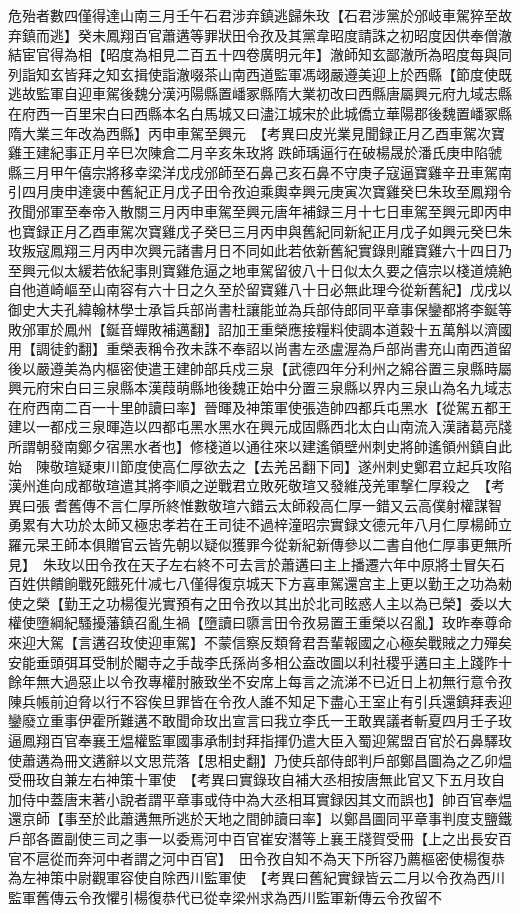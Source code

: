 危殆者數四僅得達山南三月壬午石君涉弃鎮逃歸朱玫【石君涉黨於邠岐車駕猝至故弃鎮而逃】癸未鳳翔百官蕭遘等罪狀田令孜及其黨韋昭度請誅之初昭度因供奉僧澈結宦官得為相【昭度為相見二百五十四卷廣明元年】澈師知玄鄙澈所為昭度每與同列詣知玄皆拜之知玄揖使詣澈啜茶山南西道監軍馮翊嚴遵美迎上於西縣【節度使既逃故監軍自迎車駕後魏分漢沔陽縣置嶓冢縣隋大業初改曰西縣唐屬興元府九域志縣在府西一百里宋白曰西縣本名白馬城又曰濜江城宋於此城僑立華陽郡後魏置嶓冢縣隋大業三年改為西縣】丙申車駕至興元　【考異曰皮光業見聞録正月乙酉車駕次寶雞王建紀事正月辛巳次陳倉二月辛亥朱玫將跌師瑀逼行在破楊晟於潘氏庚申陷虢縣三月甲午僖宗將移幸梁洋戊戌邠師至石鼻己亥石鼻不守庚子寇逼寶雞辛丑車駕南引四月庚申達褒中舊紀正月戊子田令孜迫乘輿幸興元庚寅次寶雞癸巳朱玫至鳳翔令孜聞邠軍至奉帝入散關三月丙申車駕至興元唐年補録三月十七日車駕至興元即丙申也寶録正月乙酉車駕次寶雞戊子癸巳三月丙申與舊紀同新紀正月戊子如興元癸巳朱玫叛寇鳳翔三月丙申次興元諸書月日不同如此若依新舊紀實錄則離寶雞六十四日乃至興元似太緩若依紀事則寶雞危逼之地車駕留彼八十日似太久要之僖宗以棧道燒絶自他道崎嶇至山南容有六十日之久至於留寶雞八十日必無此理今從新舊紀】戊戌以御史大夫孔緯翰林學士承旨兵部尚書杜讓能並為兵部侍郎同平章事保鑾都將李鋋等敗邠軍於鳳州【鋋音蟬敗補邁翻】詔加王重榮應接糧料使調本道穀十五萬斛以濟國用【調徒釣翻】重榮表稱令孜未誅不奉詔以尚書左丞盧渥為戶部尚書充山南西道留後以嚴遵美為内樞密使遣王建帥部兵戍三泉【武德四年分利州之綿谷置三泉縣時屬興元府宋白曰三泉縣本漢葭萌縣地後魏正始中分置三泉縣以界内三泉山為名九域志在府西南二百一十里帥讀曰率】晉暉及神策軍使張造帥四都兵屯黑水【從駕五都王建以一都戍三泉暉造以四都屯黑水黑水在興元成固縣西北太白山南流入漢諸葛亮牋所謂朝發南鄭夕宿黑水者也】修棧道以通往來以建遙領壁州刺史將帥遙領州鎮自此始　陳敬瑄疑東川節度使高仁厚欲去之【去羌呂翻下同】遂州刺史鄭君立起兵攻陷漢州進向成都敬瑄遣其將李順之逆戰君立敗死敬瑄又發維茂羌軍撃仁厚殺之　【考異曰張耆舊傳不言仁厚所終惟數敬瑄六錯云太師殺高仁厚一錯又云高僕射權謀智勇累有大功於太師又極忠孝若在王司徒不過梓潼昭宗實録文德元年八月仁厚楊師立羅元杲王師本俱贈官云皆先朝以疑似獲罪今從新紀新傳參以二書自他仁厚事更無所見】　朱玫以田令孜在天子左右終不可去言於蕭遘曰主上播遷六年中原將士冒矢石百姓供饋餉戰死餓死什减七八僅得復京城天下方喜車駕還宫主上更以勤王之功為勑使之榮【勤王之功楊復光實預有之田令孜以其出於北司眩惑人主以為已榮】委以大權使墮綱紀騷擾藩鎮召亂生禍【墮讀曰隳言田令孜易置王重榮以召亂】玫昨奉尊命來迎大駕【言遘召玫使迎車駕】不蒙信察反類脅君吾輩報國之心極矣戰賊之力殫矣安能垂頭弭耳受制於閹寺之手哉李氏孫尚多相公盍改圖以利社稷乎遘曰主上踐阼十餘年無大過惡止以令孜專權肘腋致坐不安席上每言之流涕不已近日上初無行意令孜陳兵帳前迫脅以行不容俟旦罪皆在令孜人誰不知足下盡心王室止有引兵還鎮拜表迎鑾廢立重事伊霍所難遘不敢聞命玫出宣言曰我立李氏一王敢異議者斬夏四月壬子玫逼鳳翔百官奉襄王煴權監軍國事承制封拜指揮仍遣大臣入蜀迎駕盟百官於石鼻驛玫使蕭遘為冊文遘辭以文思荒落【思相史翻】乃使兵部侍郎判戶部鄭昌圖為之乙卯煴受冊玫自兼左右神策十軍使　【考異曰實錄玫自補大丞相按唐無此官又下五月玫自加侍中蓋唐末著小說者謂平章事或侍中為大丞相耳實録因其文而誤也】帥百官奉煴還京師【事至於此蕭遘無所逃於天地之間帥讀曰率】以鄭昌圖同平章事判度支鹽鐵戶部各置副使三司之事一以委焉河中百官崔安潛等上襄王牋賀受冊【上之出長安百官不扈從而奔河中者謂之河中百官】　田令孜自知不為天下所容乃薦樞密使楊復恭為左神策中尉觀軍容使自除西川監軍使　【考異曰舊紀實録皆云二月以令孜為西川監軍舊傳云令孜懼引楊復恭代已從幸梁州求為西川監軍新傳云令孜留不